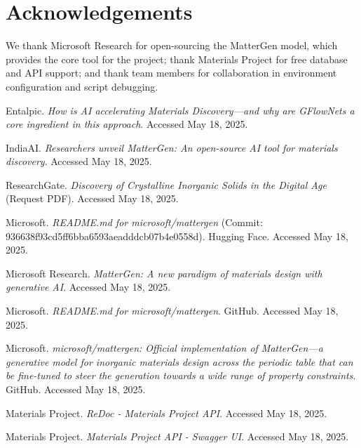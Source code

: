\documentclass[letterpaper]{article} %
\begin{document}
\section*{Acknowledgements}
We thank Microsoft Research for open-sourcing the MatterGen model, which provides the core tool for the project; thank Materials Project for free database and API support; and thank team members for collaboration in environment configuration and script debugging.


\begin{thebibliography}{99} %

 Entalpic. \textit{How is AI accelerating Materials Discovery—and why are GFlowNets a core ingredient in this approach}. Accessed May 18, 2025.

 IndiaAI. \textit{Researchers unveil MatterGen: An open-source AI tool for materials discovery}. Accessed May 18, 2025.

 ResearchGate. \textit{Discovery of Crystalline Inorganic Solids in the Digital Age} (Request PDF). Accessed May 18, 2025.

 Microsoft. \textit{README.md for microsoft/mattergen} (Commit: 936638f93cd5ff6bba6593aeadddcb07b4e0558d). Hugging Face. Accessed May 18, 2025.

 Microsoft Research. \textit{MatterGen: A new paradigm of materials design with generative AI}. Accessed May 18, 2025.

 Microsoft. \textit{README.md for microsoft/mattergen}. GitHub. Accessed May 18, 2025.

 Microsoft. \textit{microsoft/mattergen: Official implementation of MatterGen—a generative model for inorganic materials design across the periodic table that can be fine-tuned to steer the generation towards a wide range of property constraints}. GitHub. Accessed May 18, 2025.

 Materials Project. \textit{ReDoc - Materials Project API}. Accessed May 18, 2025.

 Materials Project. \textit{Materials Project API - Swagger UI}. Accessed May 18, 2025.


\end{thebibliography}
\end{document}
